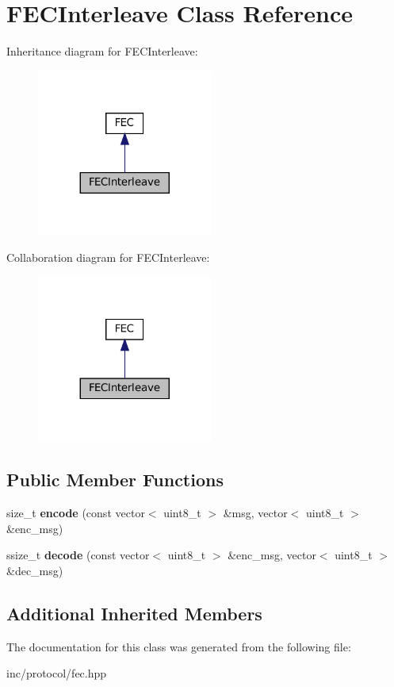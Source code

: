 \hypertarget{classFECInterleave}{}\section{F\+E\+C\+Interleave Class Reference}
\label{classFECInterleave}


Inheritance diagram for F\+E\+C\+Interleave\+:
\nopagebreak
\begin{figure}[H]
\begin{center}
\leavevmode
\includegraphics[width=164pt]{classFECInterleave__inherit__graph}
\end{center}
\end{figure}


Collaboration diagram for F\+E\+C\+Interleave\+:
\nopagebreak
\begin{figure}[H]
\begin{center}
\leavevmode
\includegraphics[width=164pt]{classFECInterleave__coll__graph}
\end{center}
\end{figure}
\subsection*{Public Member Functions}
\begin{DoxyCompactItemize}
\item 
\mbox{\label{classFECInterleave_a10d868d7b117193667d0406edec2ef59}} 
size\+\_\+t {\bfseries encode} (const vector$<$ uint8\+\_\+t $>$ \&msg, vector$<$ uint8\+\_\+t $>$ \&enc\+\_\+msg)
\item 
\mbox{\label{classFECInterleave_a7e45a890ff7061e0a5c3234d29ac8954}} 
ssize\+\_\+t {\bfseries decode} (const vector$<$ uint8\+\_\+t $>$ \&enc\+\_\+msg, vector$<$ uint8\+\_\+t $>$ \&dec\+\_\+msg)
\end{DoxyCompactItemize}
\subsection*{Additional Inherited Members}


The documentation for this class was generated from the following file\+:\begin{DoxyCompactItemize}
\item 
inc/protocol/fec.\+hpp\end{DoxyCompactItemize}
